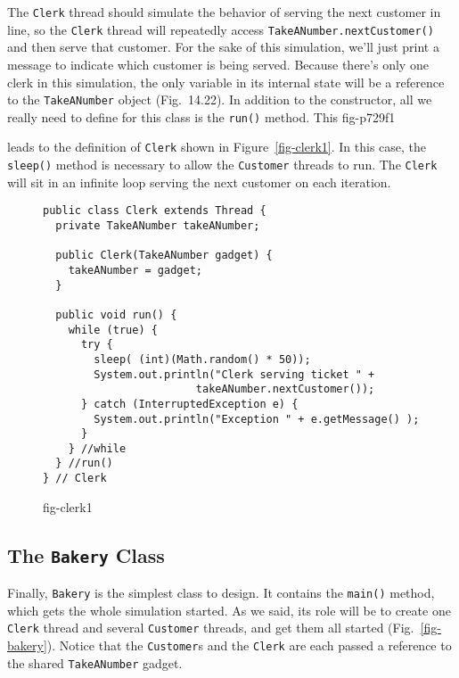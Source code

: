 \noindent The {\tt Clerk} thread should simulate the behavior of serving the
next customer in line, so the {\tt Clerk} thread will repeatedly
access {\tt TakeANumber.\-nextCustomer()} and then serve that customer.
For the sake of this simulation, we'll just print a message to
indicate which customer is being served.  Because there's only one
clerk in this simulation, the only variable in its internal state will
be a reference to the {\tt TakeANumber} object
(Fig.~14.22).  In addition to the constructor, all we
really need to define for this class is the {\tt run()} method.  This
{fig-p729f1}

leads to the definition of {\tt Clerk} shown in
Figure~\ref{fig-clerk1}.  In this case, the {\tt sleep()} method is
necessary to allow the {\tt Customer} threads to run.  The {\tt Clerk}
will sit in an infinite loop serving the next customer on each
iteration.

\begin{figure}[h]
\jjjprogstart
\begin{jjjlisting}[27pc]
\begin{lstlisting}
public class Clerk extends Thread {
  private TakeANumber takeANumber;

  public Clerk(TakeANumber gadget) {
    takeANumber = gadget;
  }

  public void run() {
    while (true) {
      try {
        sleep( (int)(Math.random() * 50));
        System.out.println("Clerk serving ticket " + 
                        takeANumber.nextCustomer());
      } catch (InterruptedException e) {
        System.out.println("Exception " + e.getMessage() );
      }
    } //while
  } //run()
} // Clerk
\end{lstlisting}
\end{jjjlisting}
{fig-clerk1}
\end{figure}


\subsection{The {\tt Bakery} Class}
\noindent Finally, {\tt Bakery} is the simplest class to design.   It contains
the {\tt main()} method, which gets the whole simulation started.   As
we said, its role will be to create one {\tt Clerk} thread and
several {\tt Customer} threads, and get them all started
(Fig.~\ref{fig-bakery}). Notice that the {\tt Customer}s and the
{\tt Clerk} are each passed a reference to the shared
{\tt TakeANumber} gadget.

